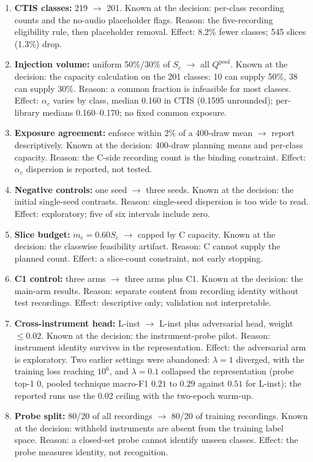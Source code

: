 \begin{enumerate}\itemsep2pt
\item \textbf{CTIS classes:} 219 $\rightarrow$ 201. Known at the decision: per-class recording counts and the no-audio placeholder flags. Reason: the five-recording eligibility rule, then placeholder removal. Effect: 8.2\% fewer classes; 545 slices (1.3\%) drop.
\item \textbf{Injection volume:} uniform 50\%/30\% of $S_c$ $\rightarrow$ all $Q^{\text{pool}}$. Known at the decision: the capacity calculation on the 201 classes: 10 can supply 50\%, 38 can supply 30\%. Reason: a common fraction is infeasible for most classes. Effect: $\alpha_c$ varies by class, median 0.160 in CTIS (0.1595 unrounded); per-library medians 0.160--0.170; no fixed common exposure.
\item \textbf{Exposure agreement:} enforce within 2\% of a 400-draw mean $\rightarrow$ report descriptively. Known at the decision: 400-draw planning means and per-class capacity. Reason: the C-side recording count is the binding constraint. Effect: $\alpha_c$ dispersion is reported, not tested.
\item \textbf{Negative controls:} one seed $\rightarrow$ three seeds. Known at the decision: the initial single-seed contrasts. Reason: single-seed dispersion is too wide to read. Effect: exploratory; five of six intervals include zero.
\item \textbf{Slice budget:} $m_c=0.60S_c$ $\rightarrow$ capped by C capacity. Known at the decision: the classwise feasibility artifact. Reason: C cannot supply the planned count. Effect: a slice-count constraint, not early stopping.
\item \textbf{C1 control:} three arms $\rightarrow$ three arms plus C1. Known at the decision: the main-arm results. Reason: separate content from recording identity without test recordings. Effect: descriptive only; validation not interpretable.
\item \textbf{Cross-instrument head:} L-inst $\rightarrow$ L-inst plus adversarial head, weight $\le 0.02$. Known at the decision: the instrument-probe pilot. Reason: instrument identity survives in the representation. Effect: the adversarial arm is exploratory. Two earlier settings were abandoned: $\lambda=1$ diverged, with the training loss reaching $10^{6}$, and $\lambda=0.1$ collapsed the representation (probe top-1 $0$, pooled technique macro-F1 $0.21$ to $0.29$ against $0.51$ for L-inst); the reported runs use the 0.02 ceiling with the two-epoch warm-up.
\item \textbf{Probe split:} 80/20 of all recordings $\rightarrow$ 80/20 of training recordings. Known at the decision: withheld instruments are absent from the training label space. Reason: a closed-set probe cannot identify unseen classes. Effect: the probe measures identity, not recognition.

\end{enumerate}
